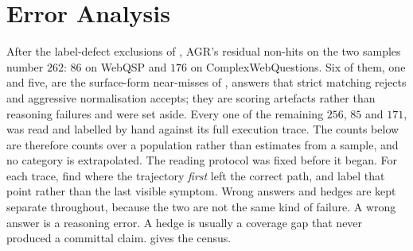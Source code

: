 %
%
%

\section{Error Analysis}\label{sec:erroranalysis}

After the label-defect exclusions of , AGR's residual
non-hits on the two samples number $262$: $86$ on WebQSP and $176$ on
ComplexWebQuestions. Six of them, one and five, are the surface-form
near-misses of , answers that strict matching rejects
and aggressive normalisation accepts; they are scoring artefacts rather
than reasoning failures and were set aside. Every one of the remaining
$256$, $85$ and $171$, was read and labelled by hand against its full
execution trace. The counts below are therefore counts over a population
rather than estimates from a sample, and no category is extrapolated.
The reading protocol was fixed before it began. For each trace, find
where the trajectory \emph{first} left the correct path, and label that
point rather than the last visible symptom. Wrong answers and hedges are
kept separate throughout, because the two are not the same kind of
failure. A wrong answer is a reasoning error. A hedge is usually a
coverage gap that never produced a committal claim. 
gives the census.

